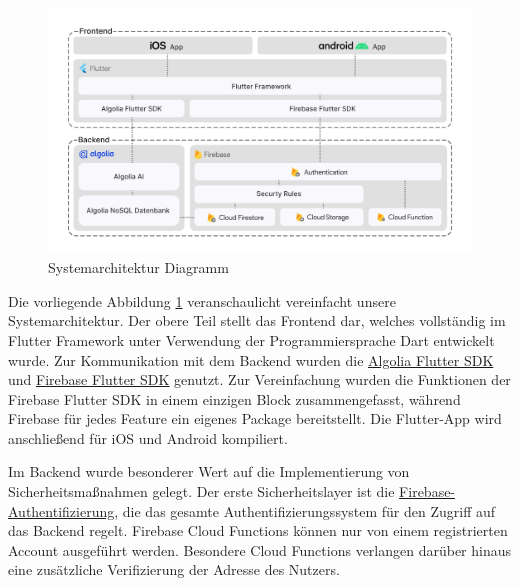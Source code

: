 
\begin{figure}[h]
    \centering
    \includegraphics[width=1\textwidth]{pics/systemarchitektur_diagram.png}
    \caption{Systemarchitektur Diagramm}
    \label{fig:systemarchitektur}
\end{figure}

% 
Die vorliegende Abbildung \ref{fig:systemarchitektur}
veranschaulicht vereinfacht unsere Systemarchitektur. Der
obere Teil stellt das Frontend dar, welches vollständig im
Flutter Framework unter Verwendung der Programmiersprache
Dart entwickelt wurde. Zur Kommunikation mit dem Backend
wurden die \href{https://pub.dev/packages/algolia}{Algolia
    Flutter SDK} und
\href{https://pub.dev/packages/firebase}{Firebase Flutter
    SDK} genutzt. Zur Vereinfachung wurden die Funktionen der
Firebase Flutter SDK in einem einzigen Block
zusammengefasst, während Firebase für jedes Feature ein
eigenes Package bereitstellt. Die Flutter-App wird
anschließend für iOS und Android kompiliert.

Im Backend wurde besonderer Wert auf die Implementierung von
Sicherheitsmaßnahmen gelegt. Der erste Sicherheitslayer ist
die
\href{https://firebase.google.com/docs/auth}{Firebase-Authentifizierung},
die das gesamte Authentifizierungssystem für den Zugriff auf
das Backend regelt. Firebase Cloud Functions können nur von
einem registrierten Account ausgeführt werden. Besondere
Cloud Functions verlangen darüber hinaus eine zusätzliche
Verifizierung der Adresse des Nutzers.

